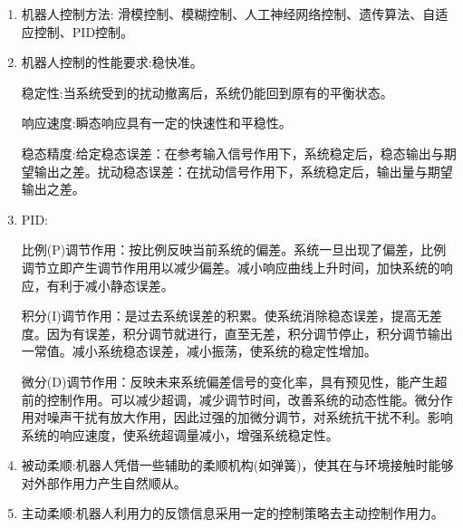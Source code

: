 \documentclass[12pt, a4paper, oneside]{ctexbook}
\begin{document}
\begin{enumerate}
	(2)多变量:
	机器人系统是一个时变系统，动力学参数随着关节运动位置的变化而变化。
	
	(3)强耦合:
	各关节具有耦合作用，表现为某一个关节的运动，会对其他关节产生动力效应，使得每个关节都要承受其他关节运动所产生的扰动。
	
	总结:机器人是一个十分复杂的多输入多输出非线性系统，且在实际应用中一般很难得到精确的动力学方程
	
	为解决以上问题，我们将复杂的整体控制问题简化为多个低阶子系统的控制问题；将控制分为单关节控制、多关节控制问题，这样前者需要考虑误差补偿问题，后者考虑耦合作用的补偿。由于工业机器人通常运动速度比较低，也要安装减速器，所以工业机器人系统就变成了一个由多关节(多轴)组成的各自独立的线性系统。
	
	\item 机器人控制方法: 滑模控制、模糊控制、人工神经网络控制、遗传算法、自适应控制、PID控制。
	
	\item 机器人控制的性能要求:稳快准。
	
	稳定性:当系统受到的扰动撤离后，系统仍能回到原有的平衡状态。
	
	响应速度:瞬态响应具有一定的快速性和平稳性。
	
	稳态精度:给定稳态误差：在参考输入信号作用下，系统稳定后，稳态输出与期望输出之差。扰动稳态误差：在扰动信号作用下，系统稳定后，输出量与期望输出之差。
	
	\item PID:
	
	比例(P)调节作用：按比例反映当前系统的偏差。系统一旦出现了偏差，比例调节立即产生调节作用用以减少偏差。减小响应曲线上升时间，加快系统的响应，有利于减小静态误差。
	
	积分(I)调节作用：是过去系统误差的积累。使系统消除稳态误差，提高无差度。因为有误差，积分调节就进行，直至无差，积分调节停止，积分调节输出一常值。减小系统稳态误差，减小振荡，使系统的稳定性增加。
	
	微分(D)调节作用：反映未来系统偏差信号的变化率，具有预见性，能产生超前的控制作用。可以减少超调，减少调节时间，改善系统的动态性能。微分作用对噪声干扰有放大作用，因此过强的加微分调节，对系统抗干扰不利。影响系统的响应速度，使系统超调量减小，增强系统稳定性。
	
	\item 被动柔顺:机器人凭借一些辅助的柔顺机构(如弹簧)，使其在与环境接触时能够对外部作用力产生自然顺从。
	
	\item 主动柔顺:机器人利用力的反馈信息采用一定的控制策略去主动控制作用力。
	

\end{enumerate}
\end{document}
